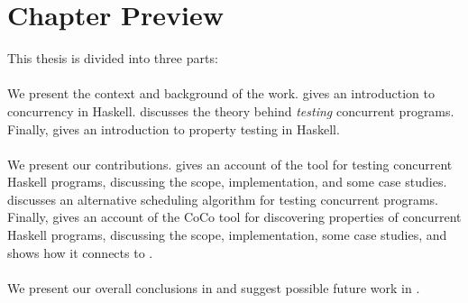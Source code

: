 \section{Chapter Preview}
\label{sec:intro-roadmap}

This thesis is divided into three parts:

\paragraph{}
We present the context and background of the work.
 gives an introduction to concurrency in
Haskell.   discusses the theory behind \emph{testing}
concurrent programs.  Finally,  gives an
introduction to property testing in Haskell.

\paragraph{}
We present our contributions.   gives an account of
the \dejafu{} tool for testing concurrent Haskell programs, discussing
the scope, implementation, and some case studies.
 discusses an alternative scheduling algorithm
for testing concurrent programs.  Finally,  gives an
account of the CoCo tool for discovering properties of concurrent
Haskell programs, discussing the scope, implementation, some case
studies, and shows how it connects to \dejafu{}.

\paragraph{}
We present our overall conclusions in  and
suggest possible future work in .
